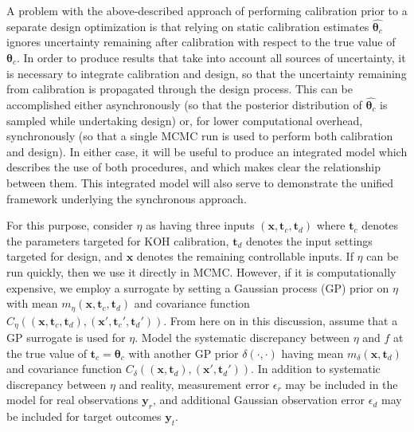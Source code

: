 \documentclass[twocolumn,10pt]{asme2ej}
\begin{document}
%
A problem with the above-described approach of performing calibration prior to a separate design optimization is that relying on static calibration estimates $\widehat{\boldsymbol \theta_c}$ ignores uncertainty remaining after calibration with respect to the true value of $\boldsymbol\theta_c$.
%
In order to produce results that take into account all sources of uncertainty, it is necessary to integrate calibration and design, so that the uncertainty remaining from calibration is propagated through the design process.
%
This can be accomplished either asynchronously (so that the posterior distribution of $\widehat{\boldsymbol\theta_c}$ is sampled while undertaking design) or, for lower computational overhead, synchronously (so that a single MCMC run is used to perform both calibration and design).
%
In either case, it will be useful to produce an integrated model which describes the use of both procedures, and which makes clear the relationship between them.
%
This integrated model will also serve to demonstrate the unified framework underlying the synchronous approach.
%

%
For this purpose, consider $\eta$ as having three inputs $(\mathbf x,\mathbf t_c,\mathbf t_d)$ where $\mathbf t_c$ denotes the parameters targeted for KOH calibration, $\mathbf t_d$ denotes the input settings targeted for design, and $\mathbf x$ denotes the remaining controllable inputs.
%
If $\eta$ can be run quickly, then we use it directly in MCMC.
%
However, if it is computationally expensive, we employ a surrogate by setting a Gaussian process (GP) prior on $\eta$ with mean $m_\eta(\mathbf x,\mathbf t_c,\mathbf t_d)$ and covariance function $C_\eta((\mathbf x,\mathbf t_c,\mathbf t_d),(\mathbf x',\mathbf t_c',\mathbf t_d'))$.
%
From here on in this discussion, assume that a GP surrogate is used for $\eta$.
%
Model the systematic discrepancy between $\eta$ and $f$ at the true value of $\mathbf t_c=\boldsymbol\theta_c$ with another GP prior $\delta(\cdot,\cdot)$ having mean $m_\delta(\mathbf x,\mathbf t_d)$ and covariance function $C_\delta((\mathbf x,\mathbf t_d),(\mathbf x',\mathbf t_d'))$.
%
In addition to systematic discrepancy between $\eta$ and reality, measurement error $\epsilon_r$ may be included in the model for real observations $\mathbf y_r$, and additional Gaussian observation error $\epsilon_d$ may be included for target outcomes $\mathbf y_t$.
%
\end{document}
